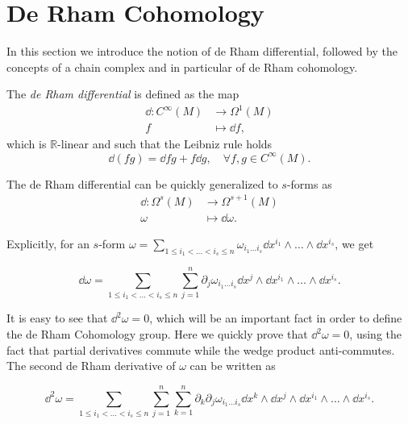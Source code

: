 \section{De Rham Cohomology}
\label{sec:derham}

In this section we introduce the notion of de Rham differential, followed by the concepts of a chain complex and in particular of de Rham cohomology.

\begin{definition}
    The \emph{de Rham differential} is defined as the map
    \begin{align*}
        \dd : C^{\infty}(M) &\rightarrow \Omega^1(M) \\
        f &\mapsto \dd f ,
    \end{align*}
    which is $\mathbb{R}$-linear and such that the Leibniz rule holds
    \begin{equation*}
        \dd (fg) = \dd fg + f \dd g, \quad \forall f, g \in C^{\infty}(M).
    \end{equation*}
\end{definition}

The de Rham differential can be quickly generalized to $s$-forms as
\begin{align*}
    \dd : \Omega^s (M) &\rightarrow \Omega^{s+1}(M) \\
    \omega &\mapsto \dd \omega .
\end{align*}

Explicitly, for an $s$-form $\omega = \sum_{1 \leq i_1 < \ldots < i_s \leq n} \omega_{i_1 \ldots i_s} \dd x^{i_1} \wedge \ldots \wedge \dd x^{i_s}$, we get

\begin{equation*}
    \dd \omega = \sum_{1 \leq i_1 < \ldots < i_s \leq n} \sum_{j = 1}^n \partial_j \omega_{i_1 \ldots i_s} \dd x^j \wedge \dd x^{i_1} \wedge \ldots \wedge \dd x^{i_s} .
\end{equation*}

It is easy to see that $\dd ^2 \omega = 0$, which will be an important fact in order to define the de Rham Cohomology group.
Here we quickly prove that $\dd^2 \omega = 0$, using the fact that partial derivatives commute while the wedge product anti-commutes.
The second de Rham derivative of $\omega$ can be written as

\begin{equation*}
    \dd ^2 \omega =
    \sum_{1 \leq i_1 < \ldots < i_s \leq n} \sum_{j = 1}^n \sum_{k = 1}^n
    \partial_k \partial_j \omega_{i_1 \ldots i_s}
    \dd x^k \wedge \dd x^j \wedge \dd x^{i_1} \wedge \ldots \wedge \dd x^{i_s}.
\end{equation*}


